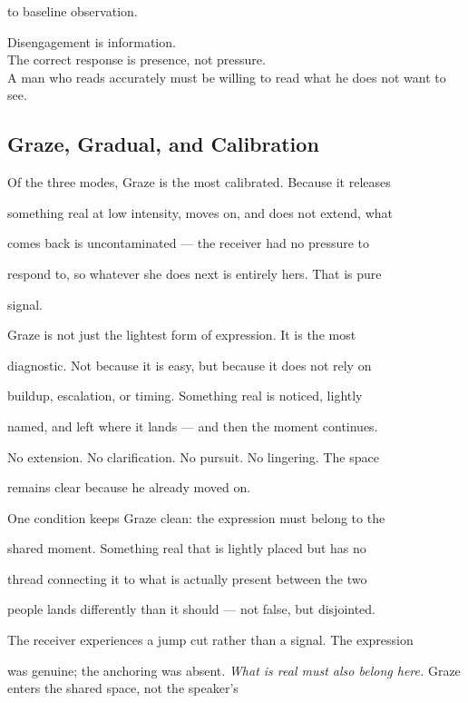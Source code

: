 \documentclass[12pt, a4paper]{article}
\begin{document}
to baseline observation.

\begin{calloutbox}

Disengagement is information.\\

The correct response is presence, not pressure.\\

A man who reads accurately must be willing to read what he does not want to see.

\end{calloutbox}

\subsection{Graze, Gradual, and Calibration}

Of the three modes, Graze is the most calibrated. Because it releases

something real at low intensity, moves on, and does not extend, what

comes back is uncontaminated --- the receiver had no pressure to

respond to, so whatever she does next is entirely hers. That is pure

signal.

Graze is not just the lightest form of expression. It is the most

diagnostic. Not because it is easy, but because it does not rely on

buildup, escalation, or timing. Something real is noticed, lightly

named, and left where it lands --- and then the moment continues.

No extension. No clarification. No pursuit. No lingering. The space

remains clear because he already moved on.

One condition keeps Graze clean: the expression must belong to the

shared moment. Something real that is lightly placed but has no

thread connecting it to what is actually present between the two

people lands differently than it should --- not false, but disjointed.

The receiver experiences a jump cut rather than a signal. The expression

was genuine; the anchoring was absent. \textit{What is real must also
belong here.} Graze enters the shared space, not the speaker's
\end{document}
